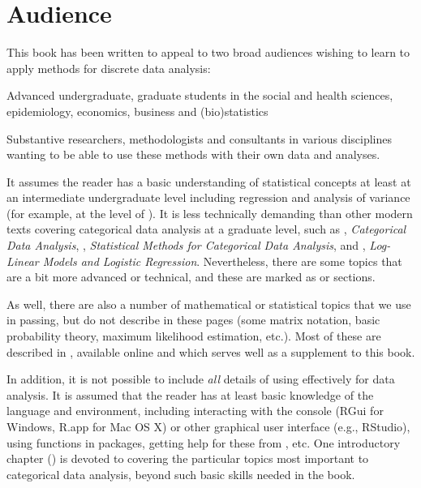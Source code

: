 \section*{Audience}
This book has been written to appeal to two broad audiences wishing to learn to apply methods for
discrete data analysis:
 \begin{itemize*}
   \item Advanced undergraduate, graduate students in the social and health sciences, epidemiology,
     economics, business and (bio)statistics
 	\item Substantive researchers, methodologists and consultants in various disciplines wanting to be able to use
 	 these methods with their own data and analyses.
 \end{itemize*}

It assumes the reader has a basic understanding of statistical concepts at least at an
intermediate undergraduate level including regression and analysis of variance
(for example, at the level of \citet{Neter-etal:90,MendenhallSincich:2003}).
It is less technically demanding than other modern texts covering
categorical data analysis at a graduate level, such as
 \citet{Agresti:2013}, \emph{Categorical Data Analysis},
 \citet{PowersXie:2008}, \emph{Statistical Methods for Categorical Data Analysis}, and
 \citet{Christensen:97}, \emph{Log-Linear Models and Logistic Regression}.
Nevertheless, there are some topics that are a bit more advanced or technical, and
these are marked as \hard or \veryhard sections.

As well, there are also a number of mathematical or 
statistical topics that we use in passing, but do not describe
in these pages (some matrix notation, basic probability theory, maximum likelihood estimation, etc.).
Most of these are described in \citet{Fox:2015}, available online and which serves well as
a supplement to this book.


In addition, it is not possible to include \emph{all} details of using \R effectively for
data analysis. It is assumed that the reader has at least basic knowledge of the \R language and
environment, including interacting with the \R console (RGui for Windows, R.app for Mac OS X)
or other graphical user interface (e.g., RStudio), using \R functions in packages,
getting help for these from \R, etc.  One introductory chapter () is devoted
to covering the particular topics most important to categorical data analysis,
beyond such basic skills needed in the book.


